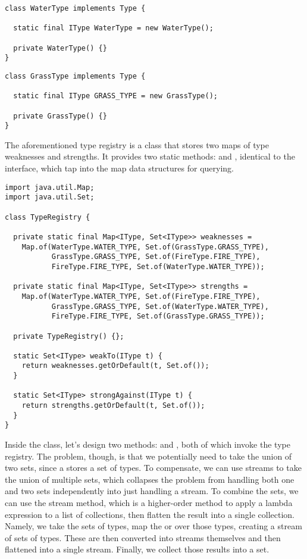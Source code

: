 \begin{lstlisting}[language=MyJava]
class WaterType implements Type {

  static final IType WaterType = new WaterType();

  private WaterType() {}
}
\end{lstlisting}

\begin{lstlisting}[language=MyJava]
class GrassType implements Type {

  static final IType GRASS_TYPE = new GrassType();

  private GrassType() {}
}
\end{lstlisting}

The aforementioned type registry is a class that stores two maps of type weaknesses and strengths. It provides two static methods:  and , identical to the  interface, which tap into the map data structures for querying.

\begin{lstlisting}[language=MyJava]
import java.util.Map;
import java.util.Set;

class TypeRegistry {

  private static final Map<IType, Set<IType>> weaknesses =
    Map.of(WaterType.WATER_TYPE, Set.of(GrassType.GRASS_TYPE),
           GrassType.GRASS_TYPE, Set.of(FireType.FIRE_TYPE),
           FireType.FIRE_TYPE, Set.of(WaterType.WATER_TYPE));

  private static final Map<IType, Set<IType>> strengths =
    Map.of(WaterType.WATER_TYPE, Set.of(FireType.FIRE_TYPE),
           GrassType.GRASS_TYPE, Set.of(WaterType.WATER_TYPE),
           FireType.FIRE_TYPE, Set.of(GrassType.GRASS_TYPE));

  private TypeRegistry() {};

  static Set<IType> weakTo(IType t) {
    return weaknesses.getOrDefault(t, Set.of());
  }

  static Set<IType> strongAgainst(IType t) {
    return strengths.getOrDefault(t, Set.of());
  }
}
\end{lstlisting}

Inside the  class, let's design two methods:  and , both of which invoke the type registry. The problem, though, is that we potentially need to take the union of two sets, since a  stores a set of types. To compensate, we can use streams to take the union of multiple sets, which collapses the problem from handling both one and two sets independently into just handling a stream. To combine the sets, we can use the  stream method, which is a higher-order method to apply a lambda expression to a list of collections, then flatten the result into a single collection. Namely, we take the sets of types, map the  or  over those types, creating a stream of sets of types. These are then converted into streams themselves and then flattened into a single stream. Finally, we collect those results into a set. 

